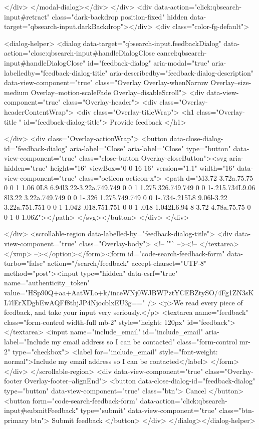     </div>
</modal-dialog></div>
  </div>
  <div data-action="click:qbsearch-input#retract" class="dark-backdrop position-fixed" hidden data-target="qbsearch-input.darkBackdrop"></div>
  <div class="color-fg-default">
    
<dialog-helper>
  <dialog data-target="qbsearch-input.feedbackDialog" data-action="close:qbsearch-input#handleDialogClose cancel:qbsearch-input#handleDialogClose" id="feedback-dialog" aria-modal="true" aria-labelledby="feedback-dialog-title" aria-describedby="feedback-dialog-description" data-view-component="true" class="Overlay Overlay-whenNarrow Overlay--size-medium Overlay--motion-scaleFade Overlay--disableScroll">
    <div data-view-component="true" class="Overlay-header">
  <div class="Overlay-headerContentWrap">
    <div class="Overlay-titleWrap">
      <h1 class="Overlay-title " id="feedback-dialog-title">
        Provide feedback
      </h1>
        
    </div>
    <div class="Overlay-actionWrap">
      <button data-close-dialog-id="feedback-dialog" aria-label="Close" aria-label="Close" type="button" data-view-component="true" class="close-button Overlay-closeButton"><svg aria-hidden="true" height="16" viewBox="0 0 16 16" version="1.1" width="16" data-view-component="true" class="octicon octicon-x">
    <path d="M3.72 3.72a.75.75 0 0 1 1.06 0L8 6.94l3.22-3.22a.749.749 0 0 1 1.275.326.749.749 0 0 1-.215.734L9.06 8l3.22 3.22a.749.749 0 0 1-.326 1.275.749.749 0 0 1-.734-.215L8 9.06l-3.22 3.22a.751.751 0 0 1-1.042-.018.751.751 0 0 1-.018-1.042L6.94 8 3.72 4.78a.75.75 0 0 1 0-1.06Z"></path>
</svg></button>
    </div>
  </div>
  
</div>
      <scrollable-region data-labelled-by="feedback-dialog-title">
        <div data-view-component="true" class="Overlay-body">        <!-- '"` --><!-- </textarea></xmp> --></option></form><form id="code-search-feedback-form" data-turbo="false" action="/search/feedback" accept-charset="UTF-8" method="post"><input type="hidden" data-csrf="true" name="authenticity_token" value="HSp90Q+aa+AatWLo+k/inceWNj0WJBWPztYCEBZtySO/4Fg1ZN3sKL7lErXDgbEwAQFf8thjJP4NjocblxEU3g==" />
          <p>We read every piece of feedback, and take your input very seriously.</p>
          <textarea name="feedback" class="form-control width-full mb-2" style="height: 120px" id="feedback"></textarea>
          <input name="include_email" id="include_email" aria-label="Include my email address so I can be contacted" class="form-control mr-2" type="checkbox">
          <label for="include_email" style="font-weight: normal">Include my email address so I can be contacted</label>
</form></div>
      </scrollable-region>
      <div data-view-component="true" class="Overlay-footer Overlay-footer--alignEnd">          <button data-close-dialog-id="feedback-dialog" type="button" data-view-component="true" class="btn">    Cancel
</button>
          <button form="code-search-feedback-form" data-action="click:qbsearch-input#submitFeedback" type="submit" data-view-component="true" class="btn-primary btn">    Submit feedback
</button>
</div>
</dialog></dialog-helper>


